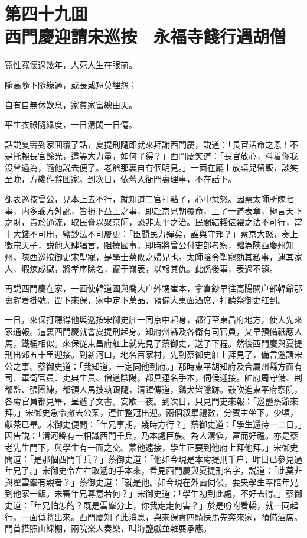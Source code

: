 
\chapter*{第四十九囬　\\西門慶迎請宋巡按　永福寺餞行遇胡僧}


\begin{myquote}
寬性寬懷過幾年，人死人生在眼前。

隨高隨下隨緣過，或長或短莫埋怨；

自有自無休歎息，家貧家富總由天。

平生衣祿隨緣度，一日清閑一日僊。
\end{myquote}

話説夏壽到家囬覆了話，夏提刑隨即就來拜謝西門慶，説道：「長官活命之恩！不是托賴長官餘光，這等大力量，如何了得？」西門慶笑道：「長官放心，料着你我沒曾過為，隨他説去便了。老爺那裏自有個明見。」一面在廳上放桌兒留飯，談笑至晚，方纔作辭囬家。到次日，依舊入衙門裏理事，不在話下。

卻表巡按曾公，見本上去不行，就知道二官打點了，心中忿怒。因蔡太師所陳七事，内多乖方舛訛，皆損下益上之事，即赴京見朝覆命，上了一道表章，極言天下之財，貴於通流，取民膏以聚京師，恐非太平之治。民間結糶俵糴之法不可行，當十大錢不可用，鹽鈔法不可屢更：「臣聞民力殫矣，誰與守邦？」蔡京大怒，奏上徽宗天子，説他大肆猖言，阻撓國事。即時將曾公付吏部考察，黜為陝西慶州知州。陝西巡按御史宋聖寵，是學士蔡攸之婦兄也。太師陰令聖寵劾其私事，逮其家人，煆煉成獄，將孝序除名，竄于嶺表，以報其仇。此係後事，表過不題。

再説西門慶在家，一面使韓道國與喬大户外甥崔本，拿倉鈔早往高陽關户部韓爺那裏趕着掛號。㽞下來保，家中定下菓品，預備大桌面酒席，打聽祭御史舡到。

一日，來保打聽得他與巡按宋御史舡一同京中起身，都行至東昌府地方，使人先來家通報。這裏西門慶就會夏提刑起身。知府州縣及各衛有司官員，又早預備祇應人馬，鐵桶相似。來保従東昌府舡上就先見了蔡御史，送了下程。然後西門慶與夏提刑出郊五十里迎接。到新河口，地名百家村，先到蔡御史舡上拜見了，備言邀請宋公之事。蔡御史道：「我知道，一定同他到府。」那時東平胡知府及合屬州縣方面有司、軍衛官員、吏典生員、僧道陰陽，都具連名手本，伺候迎接。帥府周守備、荆都監、張團練，都領人馬披執跟隨，清蹕傳道，鷄犬皆隱跡。鼓吹進東平府察院，各䖏官員都見畢，呈遞了文書。安歇一夜。到次日，只見門吏來報：「巡鹽蔡爺來拜。」宋御史急令撤去公案，連忙整冠出迎。兩個叙畢禮數，分賓主坐下。少頃，獻茶已畢。宋御史便問：「年兄事期，幾時方行？」蔡御史道：「學生還待一二日。」因告説：「清河縣有一相識西門千兵，乃本處巨族。為人清愼，富而好禮。亦是蔡老先生門下，與學生有一面之交。蒙他遠接，學生正要到他府上拜他拜。」宋御史問道：「是那個西門千兵？」蔡御史道：「他如今現是本䖏提刑千户，昨日已參見過年兄了。」宋御史令左右取遞的手本來，看見西門慶與夏提刑名字，説道：「此莫非與翟雲峯有親者？」蔡御史道：「就是他。如今現在外面伺候，要央學生奉陪年兄到他家一飯。未審年兄尊意若何？」宋御史道：「學生初到此處，不好去得。」蔡御史道：「年兄怕怎的？既是雲峯分上，你我走走何害？」於是吩咐看轎，就一同起行。一面傳將出來。西門慶知了此消息，與來保賁四騎快馬先奔來家，預備酒席。門首搭照山綵棚，兩院楽人奏樂，叫海鹽戲並雜耍承應。

